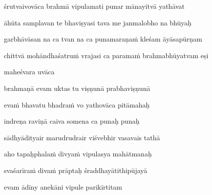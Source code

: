 \ujvers\nemsloka 
śrutvaivovāca brahmā vipulamati punar mānayitvā yathāvat
\dontdisplaylinenum

\nemslokab 
āhūta samplavan te bhaviṣyasi tava me janmalobho na bhūyaḥ \danda\dontdisplaylinenum

\nemslokac 
garbhāvāsan na ca tvan na ca punamaraṇaṁ kleśam āyāsapūrṇam
\dontdisplaylinenum

\nemslokad 
chittvā mohāndhaśatruṁ vrajasi ca paramaṁ brahmabhūyatvam eṣi \veg\dontdisplaylinenum

\vers
{}

maheśvara uvāca~{\dandab}\dontdisplaylinenum 

brahmaṇā evam uktas tu viṣṇunā prabhaviṣṇunā\thinspace{\danda} \dontdisplaylinenum

evaṁ bhavatu bhadraṁ vo yathovāca pitāmahaḥ \veg\dontdisplaylinenum
{}

indreṇa raviṇā caiva somena ca punaḥ punaḥ\thinspace{\dandab} \dontdisplaylinenum

sādhyādityair marudrudrair viśvebhir vasavais tathā \veg\dontdisplaylinenum
{}

aho tapaḥphalaṁ divyaṁ vipulasya mahātmanaḥ\thinspace{\dandab} \dontdisplaylinenum

svaśarīraṁ divaṁ prāptaḥ śraddhayātithipūjayā \veg\dontdisplaylinenum
{}

evam ādīny anekāni vipule parikīrtitam\thinspace{\dandab} \dontdisplaylinenum

